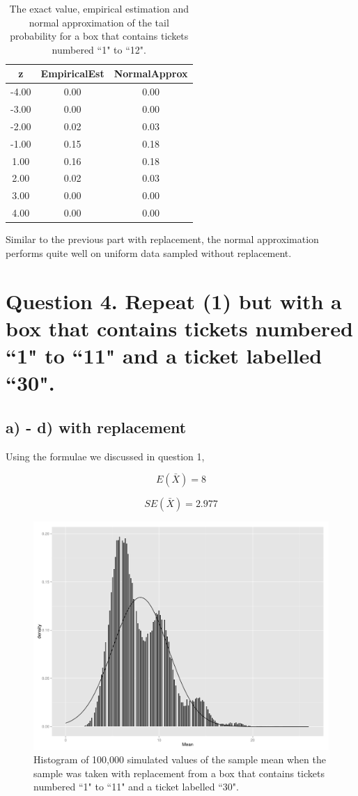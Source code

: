 \documentclass[11pt]{article}
\begin{document}
\begin{table}[H]
\centering
\begin{tabular}{|c|cc|}
  \hline
z & EmpiricalEst & NormalApprox \\ 
  \hline
-4.00 & 0.00 & 0.00 \\ 
  -3.00 & 0.00 & 0.00 \\ 
  -2.00 & 0.02 & 0.03 \\ 
  -1.00 & 0.15 & 0.18 \\ 
  1.00 & 0.16 & 0.18 \\ 
  2.00 & 0.02 & 0.03 \\ 
  3.00 & 0.00 & 0.00 \\ 
  4.00 & 0.00 & 0.00 \\ 
   \hline
\end{tabular}
\caption{The exact value, empirical estimation and normal approximation of the tail probability for a box that contains tickets numbered ``1" to ``12".} 
\end{table}


\noindent Similar to the previous part with replacement, the normal approximation performs quite well on uniform data sampled without replacement.



\pagebreak

 \section*{Question 4. Repeat (1) but with a box that contains tickets numbered ``1" to ``11" and a ticket labelled ``30".}
 
 \subsection*{a) - d) with replacement}
Using the formulae we discussed in question 1,

$$E(\bar{X})= 8$$ 
 
 $$SE(\bar{X}) = 2.977$$

 
\begin{figure}[H]
\centering
\includegraphics[width = .5\textwidth]{histogram_4c-1.pdf}
\caption{Histogram of 100,000 simulated values of the sample mean when the sample was taken with replacement from a box that contains tickets numbered ``1" to ``11" and a ticket labelled ``30".}\label{fig:q4c}
\end{figure}
 
\end{document}
